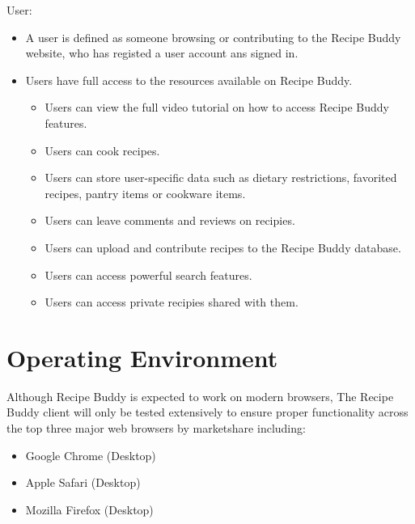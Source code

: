\documentclass{scrreprt}
\begin{document}
User:
\begin{itemize}
    \item A user is defined as someone browsing or contributing to the Recipe Buddy website, who has registed a user account ans signed in.
    \item Users have full access to the resources available on Recipe Buddy.
          \begin{itemize}
              \item Users can view the full video tutorial on how to access Recipe Buddy features.
              \item Users can cook recipes.
              \item Users can store user-specific data such as dietary restrictions, favorited recipes, pantry items or cookware items.
              \item Users can leave comments and reviews on recipies.
              \item Users can upload and contribute recipes to the Recipe Buddy database.
              \item Users can access powerful search features.
              \item Users can access private recipies shared with them.
          \end{itemize}
\end{itemize}

\section{Operating Environment}
Although Recipe Buddy is expected to work on modern browsers, The Recipe Buddy client will only be tested extensively to ensure proper functionality across the top three major web browsers by marketshare including:
\begin{itemize}
    \item Google Chrome (Desktop)
    \item Apple Safari (Desktop)
    \item Mozilla Firefox (Desktop)
\end{itemize}
\end{document}
